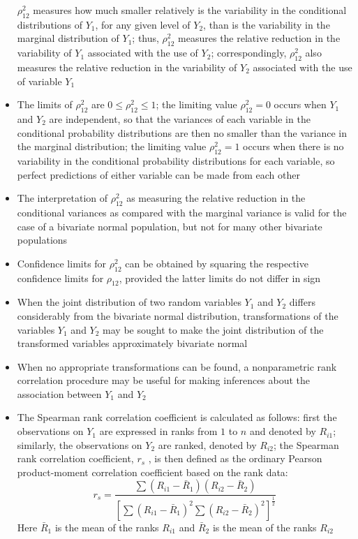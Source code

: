 \begin{itemize}
$\rho^2_{12}$ measures how much smaller relatively is the variability in the conditional distributions of $Y_1$, for any given level of $Y_2$, than is the variability in the marginal distribution of $Y_1$; thus, $\rho^2_{12}$ measures the relative reduction in the variability of $Y_1$ associated with the use of $Y_2$; correspondingly, $\rho^2_{12}$ also measures the relative reduction in the variability of $Y_2$ associated with the use of variable $Y_1$
\item The limits of $\rho^2_{12}$ are $0 \leq \rho^2_{12} \leq 1$; the limiting value $\rho^2_{12} = 0$ occurs when $Y_1$ and $Y_2$ are independent, so that the variances of each variable in the conditional probability distributions are then no smaller than the variance in the marginal distribution; the limiting value $\rho^2_{12} = 1$ occurs when there is no variability in the conditional probability distributions for each variable, so perfect predictions of either variable can be made from each other 
\item The interpretation of $\rho^2_{12}$ as measuring the relative reduction in the conditional variances as compared with the marginal variance is valid for the case of a bivariate normal population, but not for many other bivariate populations
\item Confidence limits for $\rho^2_{12}$ can be obtained by squaring the respective confidence limits for $\rho_{12}$, provided the latter limits do not differ in sign
\item When the joint distribution of two random variables $Y_1$ and $Y_2$ differs considerably from the bivariate normal distribution, transformations of the variables $Y_1$ and $Y_2$ may be sought to make the joint distribution of the transformed variables approximately bivariate normal
\item When no appropriate transformations can be found, a nonparametric rank correlation procedure may be useful for making inferences about the association between $Y_1$ and $Y_2$
\item The Spearman rank correlation coefficient is calculated as follows: first the observations on $Y_1$ are expressed in ranks from $1$ to $n$ and denoted by $R_{i1}$; similarly, the observations on $Y_2$ are ranked, denoted by $R_{i2}$; the Spearman rank correlation coefficient, $r_s$ , is then defined as the ordinary Pearson product-moment correlation coefficient based on the rank data: $$ r_s = \frac{\sum (R_{i1} - \bar{R}_1)(R_{i2} - \bar{R}_2)}{[\sum (R_{i1} - \bar{R}_1)^2 \sum (R_{i2} - \bar{R}_2)^2]^{\frac{1}{2}}} $$ Here $\bar{R}_1$ is the mean of the ranks $R_{i1}$ and $\bar{R}_2$ is the mean of the ranks $R_{i2}$

\end{itemize}
